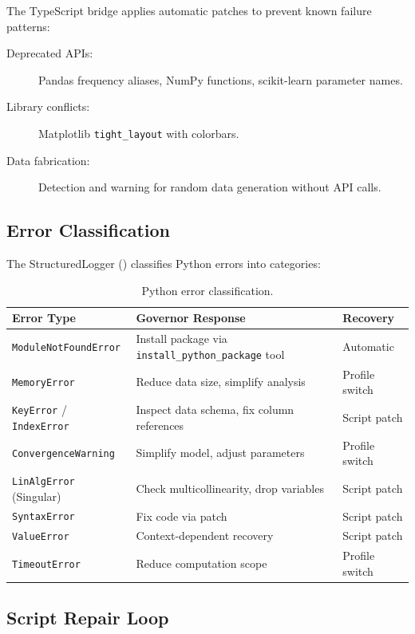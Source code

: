 The TypeScript bridge applies automatic patches to prevent known failure patterns:

\begin{description}
  \item[Deprecated APIs:] Pandas frequency aliases, NumPy functions, scikit-learn parameter names.
  \item[Library conflicts:] Matplotlib \texttt{tight\_layout} with colorbars.
  \item[Data fabrication:] Detection and warning for random data generation without API calls.
\end{description}

\subsection{Error Classification}

The StructuredLogger () classifies Python errors into categories:

\begin{table}[H]
\centering
\caption{Python error classification.}
\label{tab:python-errors}
\begin{tabularx}{\textwidth}{lXl}
\toprule
\textbf{Error Type} & \textbf{Governor Response} & \textbf{Recovery} \\
\midrule
\texttt{ModuleNotFoundError} & Install package via \texttt{install\_python\_package} tool & Automatic \\
\texttt{MemoryError} & Reduce data size, simplify analysis & Profile switch \\
\texttt{KeyError} / \texttt{IndexError} & Inspect data schema, fix column references & Script patch \\
\texttt{ConvergenceWarning} & Simplify model, adjust parameters & Profile switch \\
\texttt{LinAlgError} (Singular) & Check multicollinearity, drop variables & Script patch \\
\texttt{SyntaxError} & Fix code via patch & Script patch \\
\texttt{ValueError} & Context-dependent recovery & Script patch \\
\texttt{TimeoutError} & Reduce computation scope & Profile switch \\
\bottomrule
\end{tabularx}
\end{table}

\subsection{Script Repair Loop}

